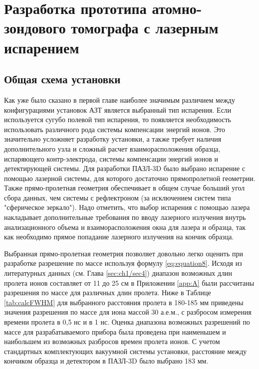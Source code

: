 \chapter{Разработка  прототипа атомно-зондового томографа с лазерным испарением}\label{ch:ch2}


\section{Общая схема установки}\label{sec:ch2/sec1}

Как уже было сказано в первой главе наиболее значимым различием между конфигурациями установок АЗТ является выбранный тип испарения. Если используется сугубо полевой тип испарения, то появляется необходимость использовать различного рода системы компенсации энергий ионов. Это значительно усложняет разработку установки, а также требует наличия дополнительного узла и сложный расчет взаиморасположения образца, испаряющего контр-электрода, системы компенсации энергий ионов и детектирующей системы. Для разработки ПАЗЛ-3D \cite{scbibAPPLE} было выбрано испарение с помощью лазерной системы, для которого достаточно прямопролетной геометрии. Также прямо-пролетная геометрия обеспечивает в общем случае больший угол сбора данных, чем системы с рефлектроном (за исключением систем типа "сферическое зеркало"). Надо отметить, что выбор испарения с помощью лазера накладывает дополнительные требования по вводу лазерного излучения внутрь анализационного объема и взаиморасположения окна для лазера и образца, так как необходимо прямое попадание лазерного излучения на кончик образца.

Выбранная прямо-пролетная геометрия позволяет довольно легко оценить при разработке  разрешение по массе используя формулу \cref{eq:equation8}. Исходя из литературных данных (см. Глава \cref{sec:ch1/sec4}) диапазон возможных длин пролета ионов составляет от 11 до 25 см в Приложении \cref{app:A} были рассчитаны разрешения по массе для различных длин пролета. Ниже в Таблице \cref{tab:calcFWHM} для выбранного расстояния пролета в 180-185 мм приведены значения разрешения по массе для иона массой 30 а.е.м., с разбросом измерения времени пролета в 0,5 нс и в 1 нс. Оценка диапазона возможных разрешений по массе для разрабатываемого прибора была проведена при наименьшем и наибольшем из возможных разбросов времен пролета ионов. С учетом  стандартных комплектующих вакуумной системы установки, расстояние между кончиком образца и детектором в ПАЗЛ-3D было выбрано 183 мм.

